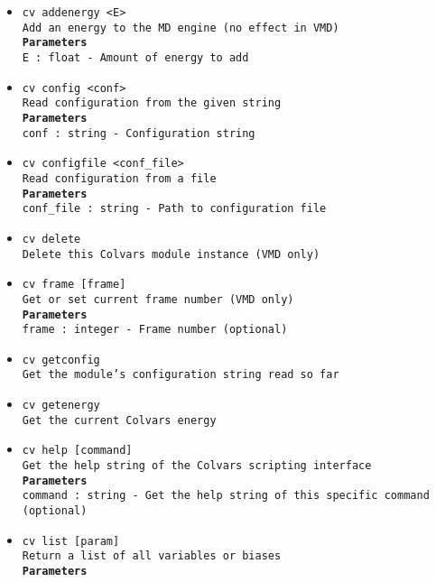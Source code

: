 \begin{itemize}
\item \texttt{cv addenergy <E>}
\\
\texttt{Add an energy to the MD engine (no effect in VMD)}
\\
\texttt{\textbf{Parameters}}
\\
\texttt{E : float - Amount of energy to add}
\item \texttt{cv config <conf>}
\\
\texttt{Read configuration from the given string}
\\
\texttt{\textbf{Parameters}}
\\
\texttt{conf : string - Configuration string}
\item \texttt{cv configfile <conf\_file>}
\\
\texttt{Read configuration from a file}
\\
\texttt{\textbf{Parameters}}
\\
\texttt{conf\_file : string - Path to configuration file}
\item \texttt{cv delete}
\\
\texttt{Delete this Colvars module instance (VMD only)}
\item \texttt{cv frame [frame]}
\\
\texttt{Get or set current frame number (VMD only)}
\\
\texttt{\textbf{Parameters}}
\\
\texttt{frame : integer - Frame number (optional)}
\item \texttt{cv getconfig}
\\
\texttt{Get the module's configuration string read so far}
\item \texttt{cv getenergy}
\\
\texttt{Get the current Colvars energy}
\item \texttt{cv help [command]}
\\
\texttt{Get the help string of the Colvars scripting interface}
\\
\texttt{\textbf{Parameters}}
\\
\texttt{command : string - Get the help string of this specific command (optional)}
\item \texttt{cv list [param]}
\\
\texttt{Return a list of all variables or biases}
\\
\texttt{\textbf{Parameters}}
\\

\end{itemize}
